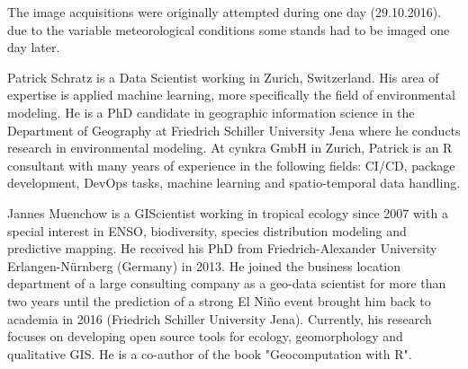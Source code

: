 \documentclass[final]{IEEEtran}
\begin{document}
The image acquisitions were originally attempted during one day (29.10.2016).
due to the variable meteorological conditions some stands had to be imaged one day later.

\pagebreak




\pagebreak

\begin{IEEEbiography}
	{Patrick Schratz}
	is a Data Scientist working in Zurich, Switzerland.
	His area of expertise is applied machine learning, more specifically the field of environmental modeling.
	He is a PhD candidate in geographic information science in the Department of Geography at Friedrich Schiller University Jena where he conducts research in environmental modeling.
	At cynkra GmbH in Zurich, Patrick is an R consultant with many years of experience in the following fields: CI/CD, package development, DevOps tasks, machine learning and spatio-temporal data handling.
\end{IEEEbiography}
\begin{IEEEbiography}
	{Jannes Muenchow}
	is a GIScientist working in tropical ecology since 2007 with a special interest in ENSO, biodiversity, species distribution modeling and predictive mapping.
	He received his PhD from Friedrich-Alexander University Erlangen-Nürnberg (Germany) in 2013.
	He joined the business location department of a large consulting company as a geo-data scientist for more than two years until the prediction of a strong El Niño event brought him back to academia in 2016 (Friedrich Schiller University Jena).
	Currently, his research focuses on developing open source tools for ecology, geomorphology and qualitative GIS.
	He is a co-author of the book "Geocomputation with R".
\end{IEEEbiography}
\end{document}
